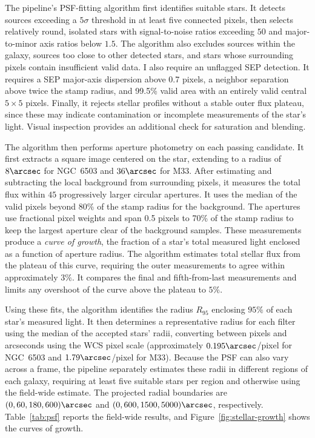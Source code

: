 The pipeline's PSF-fitting algorithm first identifies suitable stars. It detects sources exceeding a $5\sigma$ threshold in at least five connected pixels, then selects relatively round, isolated stars with signal-to-noise ratios exceeding $50$ and major-to-minor axis ratios below $1.5$. The algorithm also excludes sources within the galaxy, sources too close to other detected stars, and stars whose surrounding pixels contain insufficient valid data. I also require an unflagged SEP detection. It requires a SEP major-axis dispersion above 0.7 pixels, a neighbor separation above twice the stamp radius, and 99.5\% valid area with an entirely valid central $5\times5$ pixels. Finally, it rejects stellar profiles without a stable outer flux plateau, since these may indicate contamination or incomplete measurements of the star's light. Visual inspection provides an additional check for saturation and blending.

The algorithm then performs aperture photometry on each passing candidate. It first extracts a square image centered on the star, extending to a radius of $8\arcsec$ for NGC~6503 and $36\arcsec$ for M33. After estimating and subtracting the local background from surrounding pixels, it measures the total flux within $45$ progressively larger circular apertures. It uses the median of the valid pixels beyond 80\% of the stamp radius for the background. The apertures use fractional pixel weights and span 0.5 pixels to 70\% of the stamp radius to keep the largest aperture clear of the background samples. These measurements produce a \textit{curve of growth}, the fraction of a star's total measured light enclosed as a function of aperture radius. The algorithm estimates total stellar flux from the plateau of this curve, requiring the outer measurements to agree within approximately $3\%$. It compares the final and fifth-from-last measurements and limits any overshoot of the curve above the plateau to $5\%$.

Using these fits, the algorithm identifies the radius $R_{95}$ enclosing $95\%$ of each star's measured light. It then determines a representative radius for each filter using the median of the accepted stars' radii, converting between pixels and arcseconds using the WCS pixel scale (approximately $0.195\arcsec$/pixel for NGC~6503 and $1.79\arcsec$/pixel for M33). Because the PSF can also vary across a frame, the pipeline separately estimates these radii in different regions of each galaxy, requiring at least five suitable stars per region and otherwise using the field-wide estimate. The projected radial boundaries are $(0,60,180,600)\arcsec$ and $(0,600,1500,5000)\arcsec$, respectively. Table~\ref{tab:psf} reports the field-wide results, and Figure~\ref{fig:stellar-growth} shows the curves of growth.


